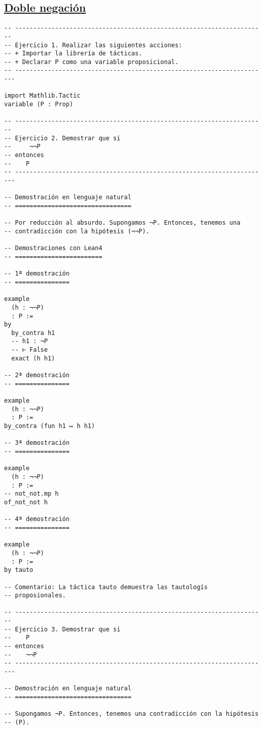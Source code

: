 \subsection{\href{./src/Logica/Doble\_negacion.lean}{Doble negación}}
\label{sec:orgb9dde72}
\begin{verbatim}
-- ---------------------------------------------------------------------
-- Ejercicio 1. Realizar las siguientes acciones:
-- + Importar la librería de tácticas.
-- + Declarar P como una variable proposicional.
-- ----------------------------------------------------------------------

import Mathlib.Tactic
variable (P : Prop)

-- ---------------------------------------------------------------------
-- Ejercicio 2. Demostrar que si
--     ¬¬P
-- entonces
--    P
-- ----------------------------------------------------------------------

-- Demostración en lenguaje natural
-- ================================

-- Por reducción al absurdo. Supongamos ¬P. Entonces, tenemos una
-- contradicción con la hipótesis (¬¬P).

-- Demostraciones con Lean4
-- ========================

-- 1ª demostración
-- ===============

example
  (h : ¬¬P)
  : P :=
by
  by_contra h1
  -- h1 : ¬P
  -- ⊢ False
  exact (h h1)

-- 2ª demostración
-- ===============

example
  (h : ¬¬P)
  : P :=
by_contra (fun h1 ↦ h h1)

-- 3ª demostración
-- ===============

example
  (h : ¬¬P)
  : P :=
-- not_not.mp h
of_not_not h

-- 4ª demostración
-- ===============

example
  (h : ¬¬P)
  : P :=
by tauto

-- Comentario: La táctica tauto demuestra las tautologís
-- proposionales.

-- ---------------------------------------------------------------------
-- Ejercicio 3. Demostrar que si
--    P
-- entonces
--    ¬¬P
-- ----------------------------------------------------------------------

-- Demostración en lenguaje natural
-- ================================

-- Supongamos ¬P. Entonces, tenemos una contradicción con la hipótesis
-- (P).


\end{verbatim}
